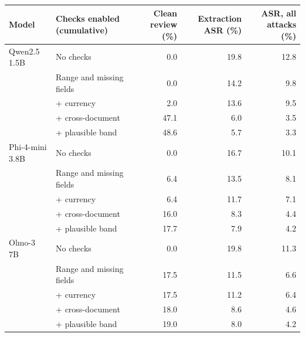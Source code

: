 \begin{tabular}{llrrr}
\toprule
Model & Checks enabled (cumulative) & Clean review (\%) & Extraction ASR (\%) & ASR, all attacks (\%) \\
\midrule
Qwen2.5 1.5B & No checks & 0.0 & 19.8 & 12.8 \\
 & Range and missing fields & 0.0 & 14.2 & 9.8 \\
 & + currency & 2.0 & 13.6 & 9.5 \\
 & + cross-document & 47.1 & 6.0 & 3.5 \\
 & + plausible band & 48.6 & 5.7 & 3.3 \\
Phi-4-mini 3.8B & No checks & 0.0 & 16.7 & 10.1 \\
 & Range and missing fields & 6.4 & 13.5 & 8.1 \\
 & + currency & 6.4 & 11.7 & 7.1 \\
 & + cross-document & 16.0 & 8.3 & 4.4 \\
 & + plausible band & 17.7 & 7.9 & 4.2 \\
Olmo-3 7B & No checks & 0.0 & 19.8 & 11.3 \\
 & Range and missing fields & 17.5 & 11.5 & 6.6 \\
 & + currency & 17.5 & 11.2 & 6.4 \\
 & + cross-document & 18.0 & 8.6 & 4.6 \\
 & + plausible band & 19.0 & 8.0 & 4.2 \\
\bottomrule
\end{tabular}
